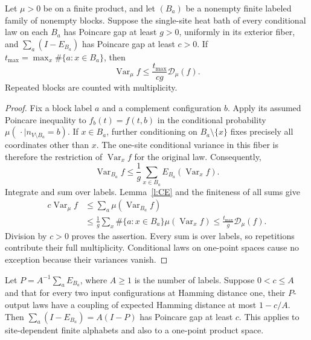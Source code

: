 \begin{lemma}\label{l:comparison}
Let \(\mu>0\) be on a finite product, and let \((B_a)\) be a
nonempty finite labeled family of nonempty blocks.
Suppose the single-site heat bath of every conditional law on each
\(B_a\) has Poincare gap at least \(g>0\), uniformly in its exterior fiber,
and \(\sum_a(I-E_{B_a})\) has Poincare gap at least \(c>0\).
If \(t_{\max}=\max_x\#\{a:x\in B_a\}\), then
\[
 \operatorname{Var}_\mu f\le
             \frac{t_{\max}}{cg}\mathcal D_\mu(f).
\]
Repeated blocks are counted with multiplicity.
\end{lemma}

\begin{proof}
Fix a block label \(a\) and a complement configuration \(b\).
Apply its assumed Poincare inequality to
\(f_b(t)=f(t,b)\) in the conditional probability
\(\mu(\,\cdot\mid n_{V\setminus B_a}=b)\).
If \(x\in B_a\), further conditioning on \(B_a\setminus\{x\}\)
fixes precisely all coordinates other than \(x\).  The one-site
conditional variance in this fiber is therefore the restriction of
\(\operatorname{Var}_x f\) for the original law.  Consequently,
\[
 \operatorname{Var}_{B_a}f
      \le\frac1g\sum_{x\in B_a}E_{B_a}
                                      (\operatorname{Var}_x f).
\]
Integrate and sum over labels.  Lemma~\ref{l:CE} and the finiteness
of all sums give
\[
 \begin{split}
 c\operatorname{Var}_\mu f
 &\le\sum_a\mu(\operatorname{Var}_{B_a}f)\\
 &\le\frac1g\sum_x\#\{a:x\in B_a\}
                         \mu(\operatorname{Var}_x f)
 \le\frac{t_{\max}}g\mathcal D_\mu(f).
 \end{split}
\]
Division by \(c>0\) proves the assertion.  Every sum is over labels,
so repetitions contribute their full multiplicity.  Conditional laws
on one-point spaces cause no exception because their variances vanish.
\end{proof}

\begin{lemma}\label{l:contraction}
Let \(P=A^{-1}\sum_aE_{B_a}\), where \(A\ge1\) is the number
of labels. Suppose \(0<c\le A\) and that for every two input
configurations at Hamming distance one, their \(P\)-output laws
have a coupling of expected Hamming distance at most \(1-c/A\).
Then \(\sum_a(I-E_{B_a})=A(I-P)\) has Poincare gap at least \(c\).
This applies to site-dependent finite alphabets and also to a
one-point product space.
\end{lemma}

